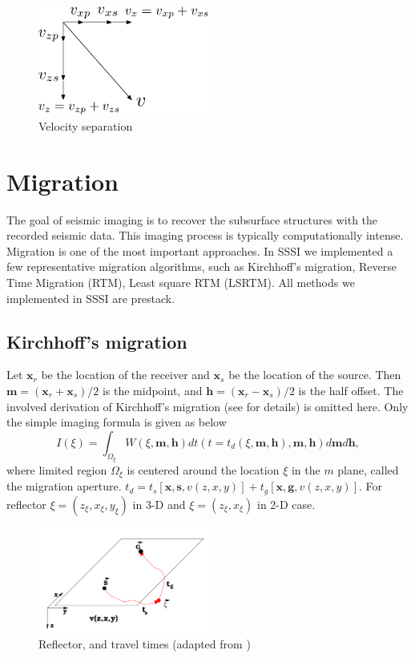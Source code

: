 \documentclass[11pt]{article}
\newcommand{\bx}{\boldsymbol{x}}
\newcommand{\bg}{\boldsymbol{g}}
\newcommand{\bh}{\boldsymbol{h}}
\newcommand{\bs}{\boldsymbol{s}}
\newcommand{\bm}{\boldsymbol{m}}
\theoremstyle{plain}
\theoremstyle{definition}
\theoremstyle{remark}
\numberwithin{equation}{section}
\begin{document}
    \begin{figure}
    \centering
    \includegraphics[width=0.5\textwidth]{Fig/EWCoordinates.pdf}
    \caption{Velocity separation}
    \end{figure}
    

\section{Migration}
The goal of seismic imaging is to recover the subsurface structures with the recorded seismic data. This imaging process is 
typically computationally intense. Migration is one of the most important approaches. In SSSI we implemented a few representative 
migration algorithms, such as
Kirchhoff's migration, Reverse Time Migration (RTM), Least square RTM (LSRTM).
All methods we implemented in SSSI are prestack.  

\subsection{Kirchhoff's migration}
Let $\bx_r$ be the location of the receiver and $\bx_s$ be the location of the source. 
Then $\bm=(\bx_r+\bx_s)/2$ is the midpoint, and $\bh=(\bx_r-\bx_s)/2$ is the half offset.
The involved derivation of Kirchhoff's migration (see \cite{Sch1978} for details) is omitted here. Only the simple imaging formula 
is given as below
\begin{equation}\label{KirkImaging}
I(\xi)=\int_{\Omega_\xi} W(\xi,\bm,\bh)dt(t=t_d(\xi,
\bm,\bh),\bm,\bh)d\bm d\bh,
\end{equation}
where limited region $\Omega_\xi$ is centered around the location $\xi$
in the $m$ plane, called the migration aperture. $t_d=t_s[\bx,\bs,v(z,x,y)]+t_g[\bx,\bg,v(z,x,y)]$.
For reflector $\xi = (z_\xi, x_\xi, y_\xi)$ in 3-D and $\xi = (z_\xi, x_\xi)$ in 2-D case.

  \begin{figure}
  \centering
  \includegraphics[width=0.5\textwidth]{Fig/tstg.PNG}
  \caption{Reflector, and travel times (adapted from \cite{bio2006})}
  \end{figure}
  
\end{document}
